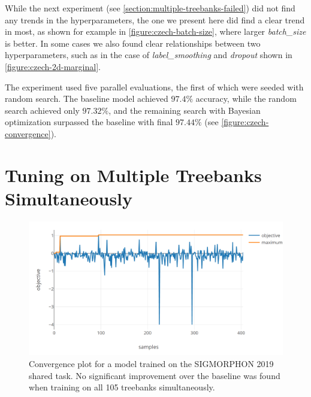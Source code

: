 While the next experiment (see \autoref{section:multiple-treebanks-failed}) did not find any trends in the hyperparameters, the one we present here did find a clear trend in most, as shown for example in \autoref{figure:czech-batch-size}, where larger \emph{batch\_size} is better. In some cases we also found clear relationships between two hyperparameters, such as in the case of \emph{label\_smoothing} and \emph{dropout} shown in \autoref{figure:czech-2d-marginal}.

The experiment used five parallel evaluations, the first of which were seeded with random search. The baseline model achieved $97.4\%$ accuracy, while the random search achieved only $97.32\%$, and the remaining search with Bayesian optimization surpassed the baseline with final $97.44\%$ (see \autoref{figure:czech-convergence}).


\section{Tuning on Multiple Treebanks Simultaneously}
\label{section:multiple-treebanks-failed}

\begin{figure}
	\begin{center}
		\includegraphics[width=1.0\textwidth]{images/sig-convergence.png}
		\caption{Convergence plot for a model trained on the SIGMORPHON 2019 shared task. No significant improvement over the baseline was found when training on all 105 treebanks simultaneously.}
		\label{figure:sigmorphon-convergence}
	\end{center}
\end{figure}

